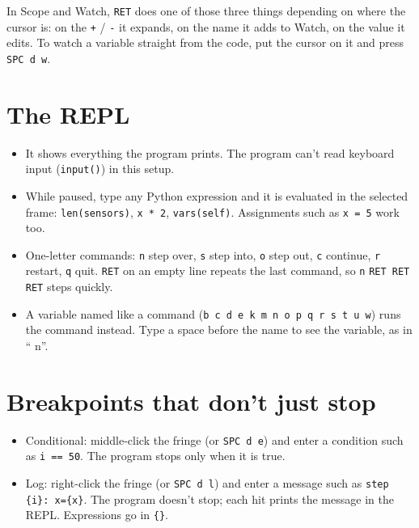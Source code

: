 \documentclass[11pt]{article}
\begin{document}
In Scope and Watch, \texttt{RET} does one of those three things depending on where
the cursor is: on the \texttt{+} / \texttt{-} it expands, on the name it adds to Watch, on
the value it edits.  To watch a variable straight from the code, put the
cursor on it and press \texttt{SPC d w}.
\section{The REPL}
\label{sec:org07a5a68}

\begin{itemize}
\item It shows everything the program prints.  The program can't read keyboard
input (\texttt{input()}) in this setup.
\item While paused, type any Python expression and it is evaluated in the
selected frame: \texttt{len(sensors)}, \texttt{x * 2}, \texttt{vars(self)}.  Assignments such as
\texttt{x = 5} work too.
\item One-letter commands: \texttt{n} step over, \texttt{s} step into, \texttt{o} step out,
\texttt{c} continue, \texttt{r} restart, \texttt{q} quit.  \texttt{RET} on an empty line repeats the
last command, so \texttt{n} \texttt{RET RET RET} steps quickly.
\item A variable named like a command (\texttt{b c d e k m n o p q r s t u w}) runs the
command instead.  Type a space before the name to see the variable, as in `` n''.
\end{itemize}
\section{Breakpoints that don't just stop}
\label{sec:org4a6ef30}

\begin{itemize}
\item Conditional: middle-click the fringe (or \texttt{SPC d e}) and enter a
condition such as \texttt{i == 50}.  The program stops only when it is true.
\item Log: right-click the fringe (or \texttt{SPC d l}) and enter a message such as
\texttt{step \{i\}: x=\{x\}}.  The program doesn't stop; each hit prints the message
in the REPL.  Expressions go in \texttt{\{\}}.
\end{itemize}
\end{document}
